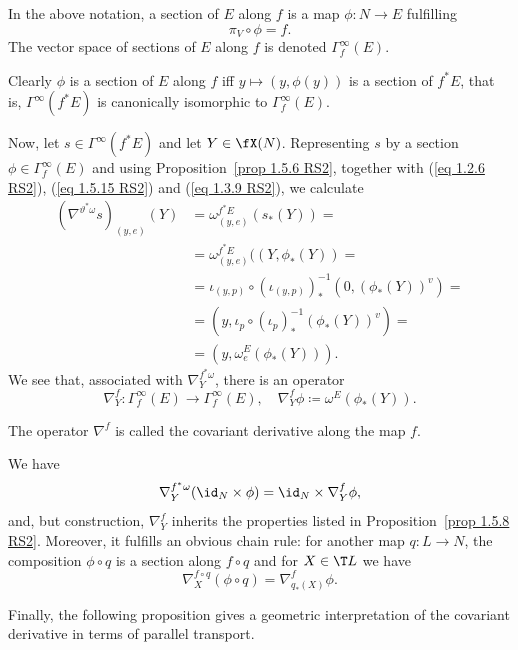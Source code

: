 \begin{defn}
    In the above notation, a section of $E$ along $f$ is a map $\phi:N\to E$ fulfilling 
    \[\pi_V\circ \phi=f.\]
    The vector space of sections of $E$ along $f$ is denoted $\Gamma_f^\infty(E)$.
\end{defn}

Clearly $\phi$ is a section of $E$ along $f$ iff $y\mapsto (y,\phi(y))$ is a section of $f^\ast E$, that is, $\Gamma^\infty(f^\ast E)$ is canonically isomorphic to $\Gamma^\infty_f(E)$.

Now, let $s\in\Gamma^\infty(f^\ast E)$ and let $Y\in\fX(N)$. Representing $s$ by a section $\phi\in \Gamma^\infty_f(E)$ and using Proposition~\ref{prop 1.5.6 RS2}, together with (\ref{eq 1.2.6 RS2}), (\ref{eq 1.5.15 RS2}) and (\ref{eq 1.3.9 RS2}), we calculate
\begin{align}
    (\nabla^{\vartheta^\ast\omega}s)_{(y,e)}(Y)&=\omega^{f^\ast E}_{(y,e)}(s_\ast(Y))=\\
    &=\omega^{f^\ast E}_{(y,e)}((Y,\phi_\ast(Y))=\\
    &=\iota_{(y,p)}\circ (\iota_{(y,p)})_\ast^{-1}(0,(\phi_\ast(Y))^v)=\\
    &=(y,\iota_p\circ (\iota_p)_\ast^{-1}(\phi_\ast(Y))^v)=\\
    &=(y,\omega^E_e(\phi_\ast(Y))).
\end{align}
We see that, associated with $\nabla^{f^\ast\omega}_Y$, there is an operator
\[\nabla^f_Y:\Gamma^\infty_f(E)\to \Gamma^\infty_f(E),\quad \nabla^f_Y \phi\coloneqq \omega^E(\phi_\ast(Y)).\label{eq 1.5.16 RS2}\]

\begin{defn}
    The operator $\nabla^f$ is called the covariant derivative along the map $f$.
\end{defn}

We have
\[\nabla_Y^{f^\ast\omega}(\id_N\times \phi)=\id_N\times \nabla^f_Y \phi,\]
and, but construction, $\nabla^f_Y$ inherits the properties listed in Proposition~\ref{prop 1.5.8 RS2}. Moreover, it fulfills an obvious chain rule: for another map $q:L\to N$, the composition $\phi\circ q$ is a section along $f\circ q$ and for $X\in \T L$ we have
\[\nabla_X^{f\circ q}(\phi\circ q)=\nabla^f_{q_\ast(X)}\phi.\]


Finally, the following proposition gives a geometric interpretation of the covariant derivative in terms of parallel transport.
  
